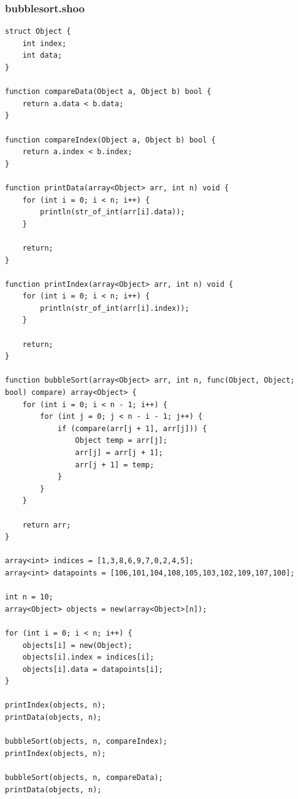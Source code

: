 \documentclass[12pt]{article}
\begin{document}
\subsubsection{bubblesort.shoo}
\begin{mdframed}[hidealllines=true,backgroundcolor=blue!20]
\begin{lstlisting}
struct Object {
	int index;
	int data;
}

function compareData(Object a, Object b) bool {
    return a.data < b.data;
}

function compareIndex(Object a, Object b) bool {
    return a.index < b.index;
}

function printData(array<Object> arr, int n) void {
	for (int i = 0; i < n; i++) {
		println(str_of_int(arr[i].data));
	}
	
	return;
}

function printIndex(array<Object> arr, int n) void {
	for (int i = 0; i < n; i++) {
		println(str_of_int(arr[i].index));
	}
	
	return;
}

function bubbleSort(array<Object> arr, int n, func(Object, Object; bool) compare) array<Object> {
	for (int i = 0; i < n - 1; i++) {
		for (int j = 0; j < n - i - 1; j++) {
			if (compare(arr[j + 1], arr[j])) {
				Object temp = arr[j];
				arr[j] = arr[j + 1];
				arr[j + 1] = temp;
			}
		}
	}
	
	return arr;
}

array<int> indices = [1,3,8,6,9,7,0,2,4,5];
array<int> datapoints = [106,101,104,108,105,103,102,109,107,100];

int n = 10;
array<Object> objects = new(array<Object>[n]);

for (int i = 0; i < n; i++) {
	objects[i] = new(Object);
	objects[i].index = indices[i]; 
	objects[i].data = datapoints[i];
}

printIndex(objects, n);
printData(objects, n);

bubbleSort(objects, n, compareIndex);
printIndex(objects, n);

bubbleSort(objects, n, compareData);
printData(objects, n);

\end{lstlisting}
\end{mdframed}
\end{document}
